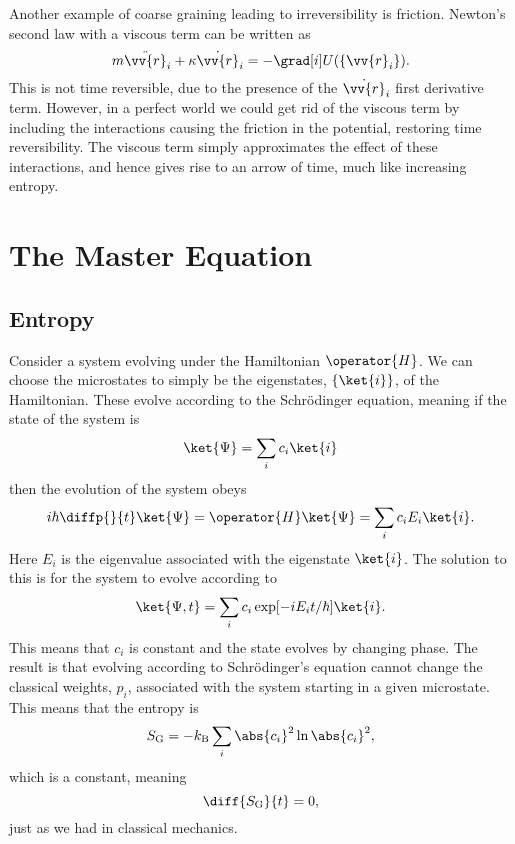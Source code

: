 \documentclass[fleqn]{NotesClass}
\newcommand*{\boltzmann}{k_{\mathrm{B}}}
\begin{document}
    Another example of coarse graining leading to irreversibility is friction.
    Newton's second law with a viscous term can be written as
    \begin{equation}
        m\ddot{\vv{r}}_i + \kappa\dot{\vv{r}}_i = - \grad[i] U(\{\vv{r}_i\}).
    \end{equation}
    This is not time reversible, due to the presence of the \(\dot{\vv{r}}_i\) first derivative term.
    However, in a perfect world we could get rid of the viscous term by including the interactions causing the friction in the potential, restoring time reversibility.
    The viscous term simply approximates the effect of these interactions, and hence gives rise to an arrow of time, much like increasing entropy.
    
    \chapter{The Master Equation}
    \section{Entropy}
    Consider a system evolving under the Hamiltonian \(\operator{H}\).
    We can choose the microstates to simply be the eigenstates, \(\{\ket{i}\}\), of the Hamiltonian.
    These evolve according to the Schrödinger equation, meaning if the state of the system is
    \begin{equation}
        \ket{\Psi} = \sum_{i} c_i\ket{i}
    \end{equation}
    then the evolution of the system obeys
    \begin{equation}
        i\hbar\diffp{}{t}\ket{\Psi} = \operator{H}\ket{\Psi} = \sum_i c_iE_i\ket{i}.
    \end{equation}
    Here \(E_i\) is the eigenvalue associated with the eigenstate \(\ket{i}\).
    The solution to this is for the system to evolve according to
    \begin{equation}
        \ket{\Psi, t} = \sum_i c_i\exp[-iE_it/\hbar]\ket{i}.
    \end{equation}
    This means that \(c_i\) is constant and the state evolves by changing phase.
    The result is that evolving according to Schrödinger's equation cannot change the classical weights, \(p_i\), associated with the system starting in a given microstate.
    This means that the entropy is
    \begin{equation}
        S_{\mathrm{G}} = -\boltzmann\sum_i \abs{c_i}^2 \ln\abs{c_i}^2,
    \end{equation}
    which is a constant, meaning
    \begin{equation}
        \diff{S_{\mathrm{G}}}{t} = 0,
    \end{equation}
    just as we had in classical mechanics.
    
\end{document}
